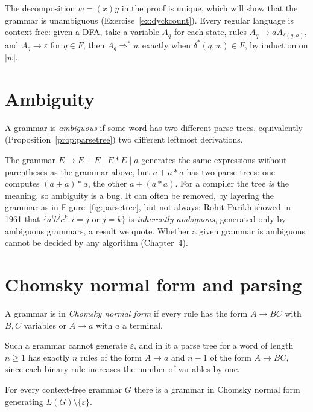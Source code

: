 The decomposition $w=(x)y$ in the proof is unique, which will show that the grammar is unambiguous (Exercise~\ref{ex:dyckcount}). Every regular language is context-free: given a DFA, take a variable $A_q$ for each state, rules $A_q\to aA_{\delta(q,a)}$, and $A_q\to\varepsilon$ for $q\in F$; then $A_{q}\Rightarrow^*w$ exactly when $\delta^*(q,w)\in F$, by induction on $|w|$.

\section{Ambiguity}\label{sec:ambiguity}

\begin{definition}\label{def:ambiguous}
A grammar is \emph{ambiguous} if some word has two different parse trees, equivalently (Proposition~\ref{prop:parsetree}) two different leftmost derivations.
\end{definition}

The grammar $E\to E+E\mid E*E\mid a$ generates the same expressions without parentheses as the grammar above, but $a+a*a$ has two parse trees: one computes $(a+a)*a$, the other $a+(a*a)$. For a compiler the tree \emph{is} the meaning, so ambiguity is a bug. It can often be removed, by layering the grammar as in Figure~\ref{fig:parsetree}, but not always: Rohit Parikh showed in 1961 that $\{a^ib^jc^k:i=j\text{ or }j=k\}$ is \emph{inherently ambiguous}, generated only by ambiguous grammars, a result we quote. Whether a given grammar is ambiguous cannot be decided by any algorithm (Chapter~4).

\section{Chomsky normal form and parsing}\label{sec:cnf}

\begin{definition}\label{def:cnf}
A grammar is in \emph{Chomsky normal form} if every rule has the form $A\to BC$ with $B,C$ variables or $A\to a$ with $a$ a terminal.
\end{definition}

Such a grammar cannot generate $\varepsilon$, and in it a parse tree for a word of length $n\ge1$ has exactly $n$ rules of the form $A\to a$ and $n-1$ of the form $A\to BC$, since each binary rule increases the number of variables by one.

\begin{theorem}[Chomsky, 1959]\label{thm:cnf}
For every context-free grammar $G$ there is a grammar in Chomsky normal form generating $L(G)\setminus\{\varepsilon\}$.
\end{theorem}

